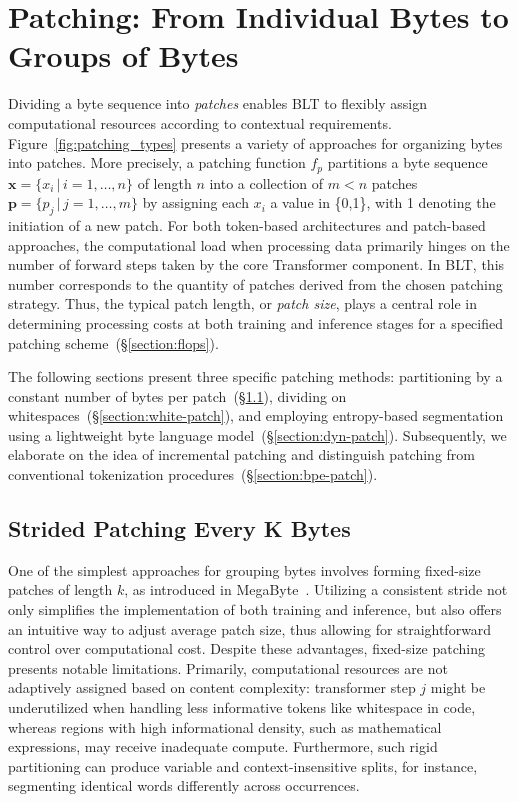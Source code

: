 \section{Patching: From Individual Bytes to Groups of Bytes}
\label{section:patching}

Dividing a byte sequence into \textit{patches} enables {\textsc BLT} to flexibly assign computational resources according to contextual requirements. Figure~\ref{fig:patching_types} presents a variety of approaches for organizing bytes into patches. More precisely, a patching function $f_p$ partitions a byte sequence $\pmb{x} = \{x_i\,|\,i=1,\ldots,n\}$ of length $n$ into a collection of $m < n$ patches $\pmb{p} = \{p_j\,|\,j=1,\ldots,m\}$ by assigning each $x_i$ a value in \{0,1\}, with 1 denoting the initiation of a new patch. For both token-based architectures and patch-based approaches, the computational load when processing data primarily hinges on the number of forward steps taken by the core Transformer component. In {\textsc BLT}, this number corresponds to the quantity of patches derived from the chosen patching strategy. Thus, the typical patch length, or \textit{patch size}, plays a central role in determining processing costs at both training and inference stages for a specified patching scheme~(\S\ref{section:flops}).

The following sections present three specific patching methods: partitioning by a constant number of bytes per patch~(\S\ref{section:static-patch}), dividing on whitespaces~(\S\ref{section:white-patch}), and employing entropy-based segmentation using a lightweight byte language model~(\S\ref{section:dyn-patch}). Subsequently, we elaborate on the idea of incremental patching and distinguish patching from conventional tokenization procedures~(\S\ref{section:bpe-patch}).

\subsection{Strided Patching Every K Bytes}
\label{section:static-patch}

One of the simplest approaches for grouping bytes involves forming fixed-size patches of length $k$, as introduced in MegaByte~\citep{yu2023megabyte}. Utilizing a consistent stride not only simplifies the implementation of both training and inference, but also offers an intuitive way to adjust average patch size, thus allowing for straightforward control over computational cost. Despite these advantages, fixed-size patching presents notable limitations. Primarily, computational resources are not adaptively assigned based on content complexity: transformer step $j$ might be underutilized when handling less informative tokens like whitespace in code, whereas regions with high informational density, such as mathematical expressions, may receive inadequate compute. Furthermore, such rigid partitioning can produce variable and context-insensitive splits, for instance, segmenting identical words differently across occurrences.

